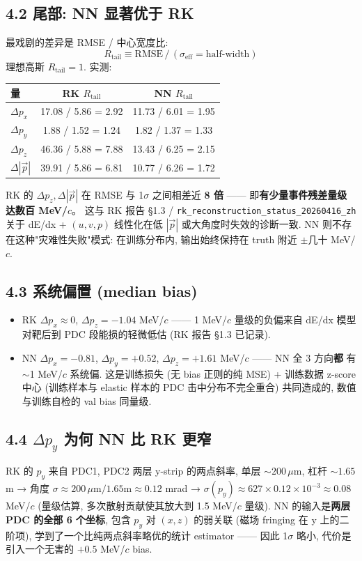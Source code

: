 \documentclass[a4paper,11pt]{article}
\begin{document}
\subsection{4.2 尾部: NN 显著优于 RK}

最戏剧的差异是 RMSE / 中心宽度比:
\[
    R_\text{tail} \equiv \text{RMSE}\,/\,(\sigma_\text{eff}=\text{half-width})
\]
理想高斯 $R_\text{tail} = 1$. 实测:
\begin{table}[H]
\centering\footnotesize
\begin{tabular}{lcc}
\toprule
量          & RK $R_\text{tail}$ & NN $R_\text{tail}$ \\
\midrule
$\Delta p_x$    & 17.08 / 5.86 = 2.92 & 11.73 / 6.01 = 1.95 \\
$\Delta p_y$    &  1.88 / 1.52 = 1.24 &  1.82 / 1.37 = 1.33 \\
$\Delta p_z$    & 46.36 / 5.88 = 7.88 & 13.43 / 6.25 = 2.15 \\
$\Delta|\vec p|$& 39.91 / 5.86 = 6.81 & 10.77 / 6.26 = 1.72 \\
\bottomrule
\end{tabular}
\end{table}

RK 的 $\Delta p_z, \Delta|\vec p|$ 在 RMSE 与 1$\sigma$ 之间相差近 \textbf{8 倍} —— 即\textbf{有少量事件残差量级达数百 MeV/$c$}。
这与 RK 报告 §1.3 / \texttt{rk\_reconstruction\_status\_20260416\_zh} 关于 dE/dx + $(u, v, p)$ 线性化在低 $|\vec p|$ 或大角度时失效的诊断一致.
NN 则不存在这种"灾难性失败"模式: 在训练分布内, 输出始终保持在 truth 附近 $\pm$几十 MeV/$c$.

\subsection{4.3 系统偏置 (median bias)}

\begin{itemize}[nosep]
    \item RK $\Delta p_x \approx 0$, $\Delta p_z = -1.04$ MeV/$c$ —— 1 MeV/$c$ 量级的负偏来自 dE/dx 模型对靶后到 PDC 段能损的轻微低估 (RK 报告 §1.3 已记录).
    \item NN $\Delta p_x = -0.81$, $\Delta p_y = +0.52$, $\Delta p_z = +1.61$ MeV/$c$ —— NN 全 3 方向\textbf{都} 有 $\sim$1 MeV/$c$ 系统偏. 这是训练损失 (无 bias 正则的纯 MSE) + 训练数据 z-score 中心 (训练样本与 elastic 样本的 PDC 击中分布不完全重合) 共同造成的, 数值与训练自检的 val bias 同量级.
\end{itemize}

\subsection{4.4 $\Delta p_y$ 为何 NN 比 RK 更窄}
RK 的 $p_y$ 来自 PDC1, PDC2 两层 y-strip 的两点斜率, 单层 $\sim 200\,\mu$m, 杠杆 $\sim 1.65$ m → 角度 $\sigma \approx 200\,\mu\text{m}/1.65\text{m} \approx 0.12$ mrad → $\sigma(p_y) \approx 627 \times 0.12 \times 10^{-3} \approx 0.08$ MeV/$c$ (量级估算, 多次散射贡献使其放大到 1.5 MeV/$c$ 量级).
NN 的输入是\textbf{两层 PDC 的全部 6 个坐标}, 包含 $p_y$ 对 $(x, z)$ 的弱关联 (磁场 fringing 在 y 上的二阶项), 学到了一个比纯两点斜率略优的统计 estimator —— 因此 1$\sigma$ 略小, 代价是引入一个无害的 $+0.5$ MeV/$c$ bias.
\end{document}
